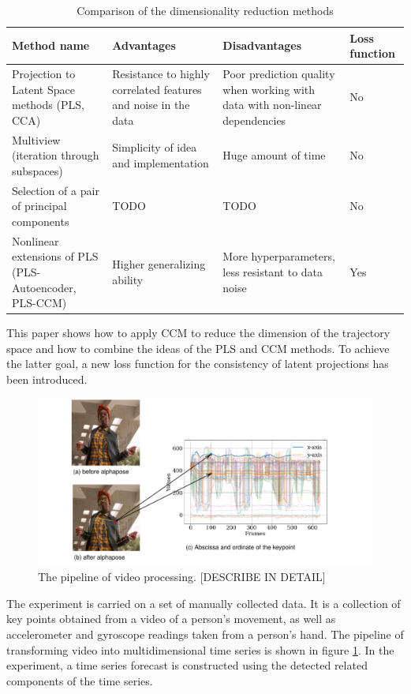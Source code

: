 \documentclass[bst/sn-mathphys]{sn-jnl}%
\theoremstyle{thmstyleone}%
\theoremstyle{thmstyletwo}%
\theoremstyle{thmstylethree}%
\begin{document}
\begingroup
\renewcommand{\arraystretch}{1.5}
\begin{table}[bhtp]
	\caption{Comparison of the dimensionality reduction methods}
	\label{tbl:dim_reduction_review}
	\begin{tabulary}{\textwidth}{L|L|L|L}
		\hline
		Method name & Advantages & Disadvantages & Loss function \\
		\hline
		Projection to Latent Space methods (PLS, CCA) & Resistance to
		highly correlated features and noise in the data & Poor prediction quality when working with data with non-linear dependencies & No \\
		\hline
		Multiview (iteration through subspaces) & Simplicity of idea and implementation & Huge amount of time & No\\
		\hline
		Selection of a pair of principal components & TODO & TODO & No \\
		\hline
		Nonlinear extensions of PLS (PLS-Autoencoder, PLS-CCM) & Higher generalizing ability & More hyperparameters, less resistant to data noise & Yes \\
		\hline
	\end{tabulary}
\end{table}
\endgroup

This paper shows how to apply CCM to reduce the dimension of the trajectory space and how to combine the ideas of the PLS and CCM methods.
To achieve the latter goal, a new loss function for the consistency of latent projections has been introduced.

\begin{figure}
	\includegraphics[width=\textwidth]{alphapose_pipeline.pdf}
	\caption{The pipeline of video processing. [DESCRIBE IN DETAIL]}
	\label{fig:alphapose_pipeline}
\end{figure}

The experiment is carried on a set of manually collected data. 
It is a collection of key points obtained from a video of a person's movement, as well as accelerometer and gyroscope readings taken from a person's hand.
The pipeline of transforming video into multidimensional time series is shown in figure \ref{fig:alphapose_pipeline}.
In the experiment, a time series forecast is constructed using the detected related components of the time series.
\end{document}
